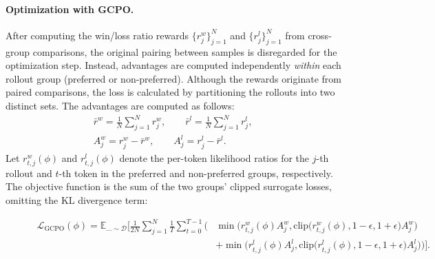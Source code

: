 \paragraph{Optimization with GCPO.}
After computing the win/loss ratio rewards $\{r^w_j\}_{j=1}^{N}$ and $\{r^l_j\}_{j=1}^{N}$ from cross-group comparisons, the original pairing between samples is disregarded for the optimization step. Instead, advantages are computed independently \emph{within} each rollout group (preferred or non-preferred). Although the rewards originate from paired comparisons, the loss is calculated by partitioning the rollouts into two distinct sets. The advantages are computed as follows:
\begin{align}
& \bar{r}^w = \frac{1}{N}\sum_{j=1}^{N} r^w_j, \qquad
\bar{r}^l = \frac{1}{N}\sum_{j=1}^{N} r^l_j, 
\qquad \nonumber \\
& A^w_j = r^w_j - \bar{r}^w, 
\qquad
A^l_j = r^l_j - \bar{r}^l.
\end{align}
Let $r_{t,j}^{w}(\phi)$ and $r_{t,j}^{l}(\phi)$ denote the per-token likelihood ratios for the $j$-th rollout and $t$-th token in the preferred and non-preferred groups, respectively. The objective function is the sum of the two groups' clipped surrogate losses, omitting the KL divergence term:
\begin{figure}[t]
\vspace{-1.5em} %
\begin{equation}
\label{eq:gcpo_final}
\begin{split}
    \mathcal{L}_{\text{GCPO}}(\phi) = \mathbb{E}_{\dots\sim\mathcal{D}} \Bigg[ \frac{1}{2N} \sum_{j=1}^{N} \frac{1}{T} \sum_{t=0}^{T-1} \bigg( 
    &\min\Big( r_{t, j}^{w}(\phi)A^w_j, \text{clip}\big(r_{t, j}^{w}(\phi), 1-\epsilon, 1+\epsilon\big)A^w_j \Big) \\
    &+ \min\Big( r_{t,j}^{l}(\phi)A^l_j, \text{clip}\big(r_{t,j}^{l}(\phi), 1-\epsilon, 1+\epsilon\big)A^l_j \Big)
    \bigg) \Bigg].
\end{split}
\end{equation}
\vspace{-1.5em} %
\end{figure}


